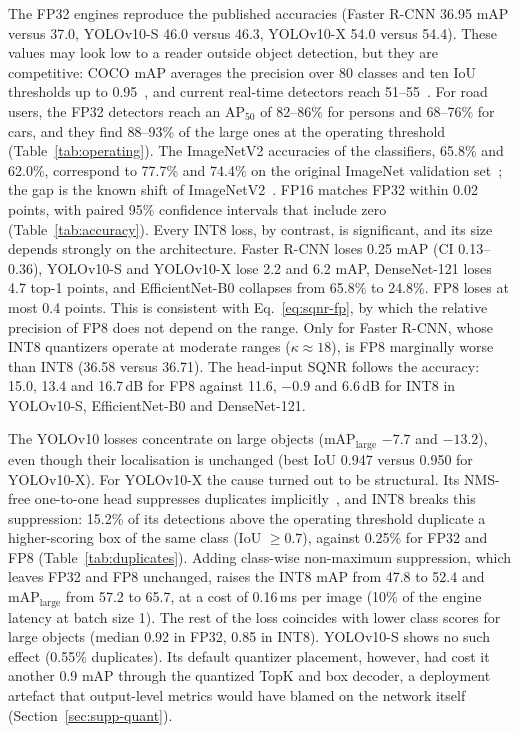 \documentclass[pdflatex,sn-mathphys-num]{sn-jnl}%
\theoremstyle{thmstyleone}%
\theoremstyle{thmstyletwo}%
\theoremstyle{thmstylethree}%
\begin{document}
The FP32 engines reproduce the published accuracies (Faster R-CNN 36.95 mAP versus 37.0, YOLOv10-S 46.0 versus 46.3, YOLOv10-X 54.0 versus 54.4). These values may look low to a reader outside object detection, but they are competitive: COCO mAP averages the precision over 80 classes and ten IoU thresholds up to 0.95~\cite{lin2014microsoft,padilla2021metrics}, and current real-time detectors reach 51--55~\cite{wang2023yolov7,zhao2024rtdetr,wang2024yolov10}. For road users, the FP32 detectors reach an AP$_{50}$ of 82--86\% for persons and 68--76\% for cars, and they find 88--93\% of the large ones at the operating threshold (Table~\ref{tab:operating}). The ImageNetV2 accuracies of the classifiers, 65.8\% and 62.0\%, correspond to 77.7\% and 74.4\% on the original ImageNet validation set~\cite{torchvision2016}; the gap is the known shift of ImageNetV2~\cite{recht2019imagenet,taori2020measuring}. FP16 matches FP32 within 0.02 points, with paired 95\% confidence intervals that include zero (Table~\ref{tab:accuracy}). Every INT8 loss, by contrast, is significant, and its size depends strongly on the architecture. Faster R-CNN loses 0.25 mAP (CI 0.13--0.36), YOLOv10-S and YOLOv10-X lose 2.2 and 6.2 mAP, DenseNet-121 loses 4.7 top-1 points, and EfficientNet-B0 collapses from 65.8\% to 24.8\%. FP8 loses at most 0.4 points. This is consistent with Eq.~\eqref{eq:sqnr-fp}, by which the relative precision of FP8 does not depend on the range. Only for Faster R-CNN, whose INT8 quantizers operate at moderate ranges ($\kappa\approx18$), is FP8 marginally worse than INT8 (36.58 versus 36.71). The head-input SQNR follows the accuracy: 15.0, 13.4 and 16.7\,dB for FP8 against 11.6, $-0.9$ and 6.6\,dB for INT8 in YOLOv10-S, EfficientNet-B0 and DenseNet-121.

The YOLOv10 losses concentrate on large objects (mAP$_\text{large}$ $-7.7$ and $-13.2$), even though their localisation is unchanged (best IoU 0.947 versus 0.950 for YOLOv10-X). For YOLOv10-X the cause turned out to be structural. Its NMS-free one-to-one head suppresses duplicates implicitly~\cite{wang2024yolov10}, and INT8 breaks this suppression: 15.2\% of its detections above the operating threshold duplicate a higher-scoring box of the same class (IoU $\geq0.7$), against 0.25\% for FP32 and FP8 (Table~\ref{tab:duplicates}). Adding class-wise non-maximum suppression, which leaves FP32 and FP8 unchanged, raises the INT8 mAP from 47.8 to 52.4 and mAP$_\text{large}$ from 57.2 to 65.7, at a cost of 0.16\,ms per image (10\% of the engine latency at batch size 1). The rest of the loss coincides with lower class scores for large objects (median 0.92 in FP32, 0.85 in INT8). YOLOv10-S shows no such effect (0.55\% duplicates). Its default quantizer placement, however, had cost it another 0.9 mAP through the quantized TopK and box decoder, a deployment artefact that output-level metrics would have blamed on the network itself (Section~\ref{sec:supp-quant}).
\end{document}

